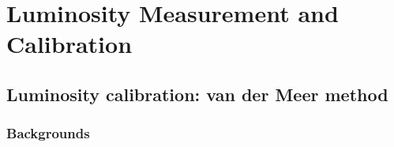 \chapter{Luminosity  Measurement and Calibration}

\section{Luminosity calibration: van der Meer method}


\subsection*{Backgrounds}



